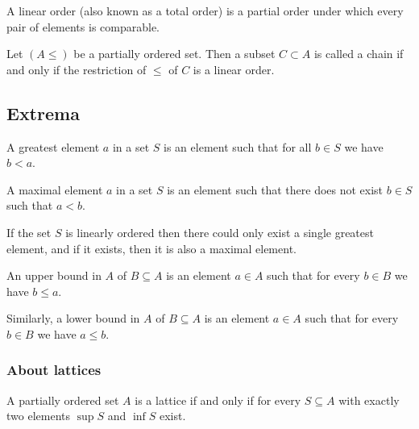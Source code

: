 \documentclass[11pt,a4paper]{article}
\begin{document}
\begin{definition}
A linear order (also known as a total order) 
is a partial order under which every pair of elements is comparable.
\end{definition}

\begin{definition}[Chain]
  Let $(A \le)$ be a partially ordered set.
  Then a subset $C \subset A$ is called a chain if and only if the restriction
  of $\le$ of $C$ is a linear order.
\end{definition}

\subsection{Extrema}

\begin{definition}
A greatest element $a$ in a set $S$ is an element such that for all $b \in S$
we have $b < a$.
\end{definition}

\begin{definition}
A maximal element $a$ in a set $S$ is an element such that there does not exist
$b \in S$ such that $a < b$.
\end{definition}

\begin{remark}
  If the set $S$ is linearly ordered then there could only exist a single
  greatest element, and if it exists, then it is also a maximal element.
\end{remark}

\begin{definition}
An upper bound in $A$ of $B \subseteq A$ is an element $a \in A$ such
that for every $b \in B$ we have $b \le a$. 
\end{definition}

\begin{remark}
Similarly, a lower bound in $A$ of $B \subseteq A$ is an element $a \in A$
such that for every $b \in B$ we have $a \le b$.
\end{remark}

\subsubsection{About lattices}
\begin{definition}[Lattice]
A partially ordered set $A$ is a lattice if and only if for
every $S \subseteq A$ with exactly two elements $\sup S$ and $\inf S$ exist.
\end{definition}
    
\end{document}
